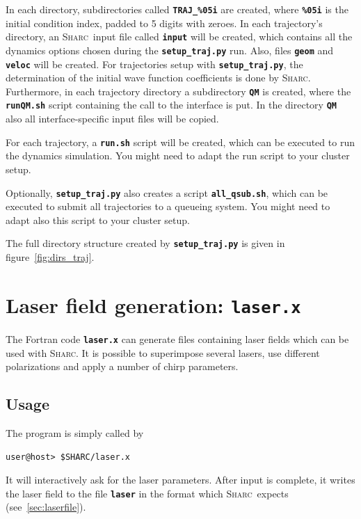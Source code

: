\documentclass[a4paper,10pt,DIV=15,openany,twoside=false]{scrbook}
\newcommand{\sharc}{\textsc{Sharc}}
\newcommand{\ttt}[1]{\textbf{\texttt{#1}}}
\begin{document}
In each directory, subdirectories called \ttt{TRAJ\_\%05i} are created, where \ttt{\%05i} is the initial condition index, padded to 5 digits with zeroes. In each trajectory's directory, an \sharc\ input file called \ttt{input} will be created, which contains all the dynamics options chosen during the \ttt{setup\_traj.py} run. Also, files \ttt{geom} and \ttt{veloc} will be created. For trajectories setup with \ttt{setup\_traj.py}, the determination of the initial wave function coefficients is done by \sharc.
Furthermore, in each trajectory directory a subdirectory \ttt{QM} is created, where the \ttt{runQM.sh} script containing the call to the interface is put. In the directory \ttt{QM} also all interface-specific input files will be copied.

For each trajectory, a \ttt{run.sh} script will be created, which can be executed to run the dynamics simulation. You might need to adapt the run script to your cluster setup.

Optionally, \ttt{setup\_traj.py} also creates a script \ttt{all\_qsub.sh}, which can be executed to submit all trajectories to a queueing system. You might need to adapt also this script to your cluster setup.

The full directory structure created by \ttt{setup\_traj.py} is given in figure~\ref{fig:dirs_traj}.








\section{Laser field generation: \ttt{laser.x}}\label{sec:laser.x}

The Fortran code \ttt{laser.x} can generate files containing laser fields which can be used with \sharc. It is possible to superimpose several lasers, use different polarizations and apply a number of chirp parameters.

\subsection{Usage}

The program is simply called by 
\begin{verbatim}
user@host> $SHARC/laser.x
\end{verbatim}
It will interactively ask for the laser parameters. After input is complete, it writes the laser field to the file \ttt{laser} in the format which \sharc\ expects (see~\ref{sec:laserfile}).
\end{document}
